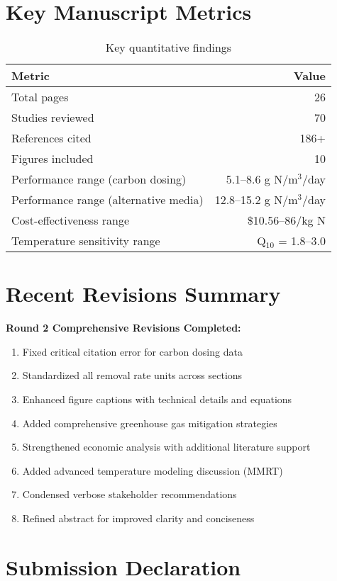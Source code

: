 \documentclass[12pt,a4paper]{article}
\begin{document}
\section{Key Manuscript Metrics}

\begin{table}[h]
\centering
\begin{tabular}{lr}
\toprule
\textbf{Metric} & \textbf{Value} \\
\midrule
Total pages & 26 \\
Studies reviewed & 70 \\
References cited & 186+ \\
Figures included & 10 \\
Performance range (carbon dosing) & 5.1--8.6 g N/m$^3$/day \\
Performance range (alternative media) & 12.8--15.2 g N/m$^3$/day \\
Cost-effectiveness range & \$10.56--86/kg N \\
Temperature sensitivity range & Q$_{10}$ = 1.8--3.0 \\
\bottomrule
\end{tabular}
\caption{Key quantitative findings}
\end{table}

\section{Recent Revisions Summary}

\textbf{Round 2 Comprehensive Revisions Completed:}
\begin{enumerate}[leftmargin=*]
\item Fixed critical citation error for carbon dosing data
\item Standardized all removal rate units across sections
\item Enhanced figure captions with technical details and equations
\item Added comprehensive greenhouse gas mitigation strategies
\item Strengthened economic analysis with additional literature support
\item Added advanced temperature modeling discussion (MMRT)
\item Condensed verbose stakeholder recommendations
\item Refined abstract for improved clarity and conciseness
\end{enumerate}

\section{Submission Declaration}
\end{document}
